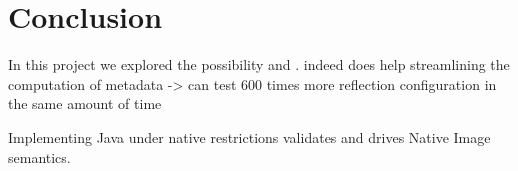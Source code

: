 \chapter{Conclusion}
% 

In this project we explored the possibility and . 
indeed does help streamlining the computation of metadata -> can test 600 times more reflection configuration in the same amount of time

Implementing Java under native restrictions validates and drives Native Image semantics.  

% 
